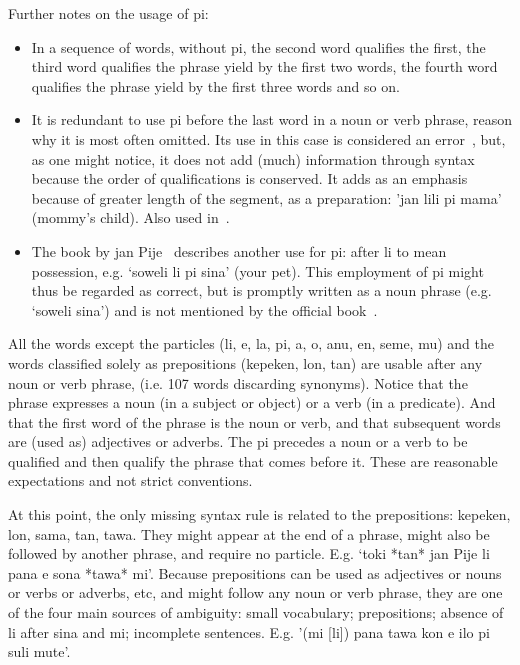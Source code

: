 \noindent Further notes on the usage of pi:
\begin{itemize}
  \item In a sequence of words, without pi, the second word qualifies
    the first, the third word qualifies the phrase yield by the first
    two words, the fourth word qualifies the phrase yield by the first
    three words and so on.
  \item It is redundant to use pi before the last word in a noun or
    verb phrase, reason why it is most often
    omitted.
    Its use in this case is considered an error~\cite{tpLang,kama},
    but, as one might notice, it does not add (much) information
    through syntax because the order of qualifications is conserved.
    It adds as an emphasis because of greater length of the segment, as a preparation: 'jan lili pi mama' (mommy's child).
    Also used in~\cite{akesiWawa}.
  \item The book by jan Pije~\cite{kama} describes another use for pi:
    after li to mean possession, e.g. `soweli li pi sina' (your pet).
    This employment of pi might thus be regarded as correct, but is promptly written
    as a noun phrase (e.g. `soweli sina') and is not mentioned
    by the official book~\cite{tpLang}.
\end{itemize}

All the words except the particles (li, e, la, pi, a, o, anu, en, seme, mu)
and the words classified solely as
prepositions (kepeken, lon, tan)
are usable after any noun or verb phrase,
(i.e. 107 words discarding synonyms).
Notice that the phrase expresses a noun (in a subject or
object) or a verb (in a predicate).
And that the first word of the phrase is the noun or verb,
and that subsequent words are (used as) adjectives or adverbs.
The pi precedes a noun or a verb to be qualified and then qualify
the phrase that comes before it.
These are reasonable expectations and not strict conventions.

At this point, the only missing syntax rule is related to
the prepositions: kepeken, lon, sama, tan, tawa.
They might appear at the end of a phrase,
might also be followed by another phrase,
and require no particle. E.g.
`toki *tan* jan Pije li pana e sona *tawa* mi'.
Because prepositions can be used as adjectives
or nouns or verbs or adverbs, etc, and might follow
any noun or verb phrase,
they are one of the four main sources of ambiguity:
small vocabulary;
prepositions; absence of li after sina and mi; incomplete sentences.
E.g. '(mi [li]) pana tawa kon e ilo pi suli mute'.

